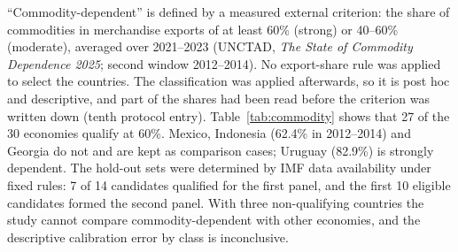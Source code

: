 ``Commodity-dependent'' is defined by a measured external criterion: the share of commodities in merchandise exports of at least 60\% (strong) or 40--60\% (moderate), averaged over 2021--2023 (UNCTAD, \emph{The State of Commodity Dependence 2025}; second window 2012--2014). No export-share rule was applied to select the countries. The classification was applied afterwards, so it is post hoc and descriptive, and part of the shares had been read before the criterion was written down (tenth protocol entry). Table~\ref{tab:commodity} shows that 27 of the 30 economies qualify at 60\%. Mexico, Indonesia (62.4\% in 2012--2014) and Georgia do not and are kept as comparison cases; Uruguay (82.9\%) is strongly dependent. The hold-out sets were determined by IMF data availability under fixed rules: 7 of 14 candidates qualified for the first panel, and the first 10 eligible candidates formed the second panel. With three non-qualifying countries the study cannot compare commodity-dependent with other economies, and the descriptive calibration error by class is inconclusive.

\begin{table}[t]
\centering
\caption{Commodity dependence of the three panels (UNCTAD, share of commodities in merchandise exports, average 2021--2023; classification applied post hoc).}
\label{tab:commodity}
\small
{}
\end{table}
